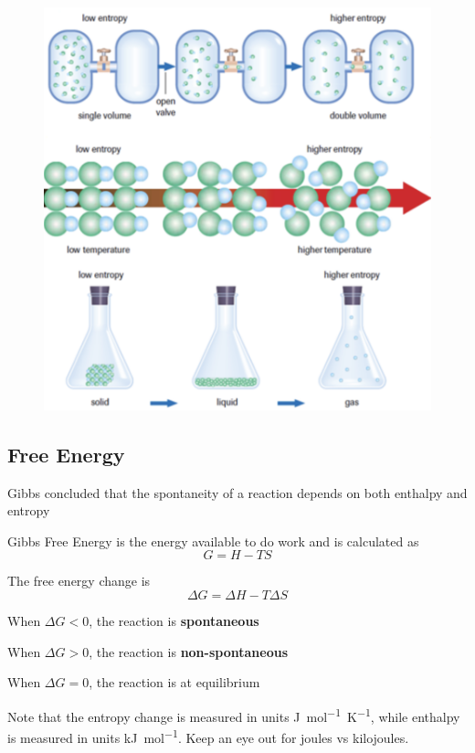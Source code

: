 \begin{figure}[ht!]
    \centering
    \includegraphics[width=0.8 \textwidth]{../figures/entropy.png}
\end{figure}

\subsection{Free Energy}
\begin{bulleted-list}
    \item Gibbs concluded that the spontaneity of a reaction depends on both enthalpy and
        entropy
    \item Gibbs Free Energy is the energy available to do work and is calculated as
        \[
            G=H-TS
        \]
    \item The free energy change is
        \[
            \Delta G=\Delta H-T\Delta S
        \]
    \item When $\Delta G<0$, the reaction is \textbf{spontaneous}
    \item When $\Delta G>0$, the reaction is \textbf{non-spontaneous}
    \item When $\Delta G=0$, the reaction is at equilibrium
\end{bulleted-list}

\begin{important}
    Note that the entropy change is measured in units \si{J.mol^{-1}.K^{-1}}, while enthalpy is
    measured in units \si{kJ.mol^{-1}}. Keep an eye out for joules vs kilojoules.
\end{important}

